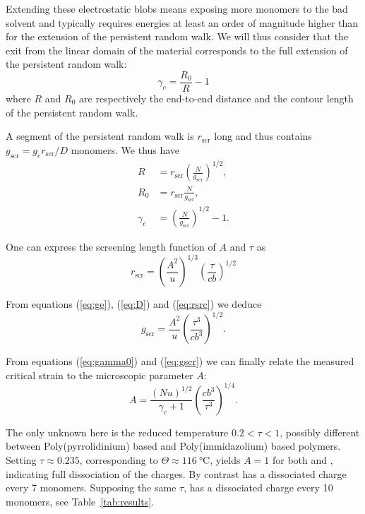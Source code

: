 \documentclass[12pt,a4paper]{article}
\begin{document}
Extending these electrostatic blobs means exposing more monomers to the bad solvent and typically requires energies at least an order of magnitude higher than for the extension of the persistent random walk. We will thus consider that the exit from the linear domain of the material corresponds to the full extension of the persistent random walk:
\begin{equation}
\gamma_c = \frac{R_0}{R} - 1
\end{equation}
where $R$ and $R_0$ are respectively the end-to-end distance and the contour length of the persistent random walk.

A segment of the persistent random walk is $r_\mathrm{scr}$ long and thus contains $g_\mathrm{scr} = g_e r_\mathrm{scr}/D$ monomers. We thus have
\begin{align}
R &= r_\mathrm{scr} \left(\frac{N}{g_\mathrm{scr}}\right)^{1/2},\\
R_0 &= r_\mathrm{scr} \frac{N}{g_\mathrm{scr}},\\
\gamma_c &= \left(\frac{N}{g_\mathrm{scr}}\right)^{1/2} -1\label{eq:gamma0}.
\end{align}

One can express the screening length function of $A$ and $\tau$ as
\begin{equation}
r_\mathrm{scr} = \left(\frac{A^2}{u}\right)^{1/3} \left(\frac{\tau}{cb}\right)^{1/2}
\label{eq:rsrc}
\end{equation}

From equations (\ref{eq:ge}), (\ref{eq:D}) and (\ref{eq:rsrc}) we deduce
\begin{equation}
g_\mathrm{scr} = \frac{A^2}{u} \left(\frac{\tau^3}{c b^3}\right)^{1/2}\label{eq:gscr}.
\end{equation}

From equations (\ref{eq:gamma0}) and (\ref{eq:gscr}) we can finally relate the measured critical strain to the microscopic parameter $A$:
\begin{equation}
A = \frac{\left(N u\right)^{1/2}}{\gamma_c+1}\left(\frac{c b^3}{\tau^3}\right)^{1/4}.
\end{equation}

The only unknown here is the reduced temperature $0.2<\tau<1$, possibly different between Poly(pyrrolidinium) based and Poly(immidazolium) based polymers. Setting $\tau\approx 0.235$, corresponding to $\Theta\approx\SI{116}{\celsius}$, yields $A=1$ for both  and , indicating full dissociation of the charges. By contrast  has a dissociated charge every 7 monomers. Supposing the same $\tau$,  has a dissociated charge every 10 monomers, see Table~\ref{tab:results}.
\end{document}
